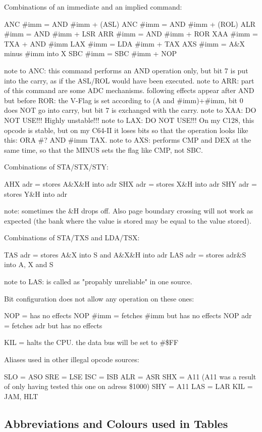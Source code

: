 \begin{code}
Combinations of an immediate and an implied command:

ANC \#{imm} = AND \#{imm} + (ASL)
ANC \#{imm} = AND \#{imm} + (ROL)
ALR \#{imm} = AND \#{imm} + LSR
ARR \#{imm} = AND \#{imm} + ROR
XAA \#{imm} = TXA + AND \#{imm}
LAX \#{imm} = LDA \#{imm} + TAX
AXS \#{imm} = A\&X minus #{imm} into X
SBC \#{imm} = SBC \#{imm} + NOP

note to ANC: this command performs an AND operation only, but bit 7 is put into the carry, as if the ASL/ROL would have been executed.
note to ARR: part of this command are some ADC mechanisms. following effects appear after AND but before ROR: the V-Flag is set according to (A and \#{imm})+\#{imm}, bit 0 does NOT go into carry, but bit 7 is exchanged with the carry.
note to XAA: DO NOT USE!!! Highly unstable!!!
note to LAX: DO NOT USE!!! On my C128, this opcode is stable, but on my C64-II it loses bits so that the operation looks like this: ORA \#? AND \#{imm} TAX.
note to AXS: performs CMP and DEX at the same time, so that the MINUS sets the flag like CMP, not SBC.


Combinations of STA/STX/STY:

AHX {adr} = stores A\&X\&H into {adr}
SHX {adr} = stores X\&H into {adr}
SHY {adr} = stores Y\&H into {adr}

note: sometimes the \&H drops off. Also page boundary crossing will not work as expected (the bank where the value is stored may be equal to the value stored).


Combinations of STA/TXS and LDA/TSX:

TAS {adr} = stores A\&X into S and A\&X\&H into {adr}
LAS {adr} = stores {adr}\&S into A, X and S

note to LAS: is called as "propably unreliable" in one source.


Bit configuration does not allow any operation on these ones:

NOP = has no effects
NOP #{imm} = fetches #{imm} but has no effects
NOP {adr} = fetches {adr} but has no effects


KIL = halts the CPU. the data bus will be set to \#\$FF


Aliases used in other illegal opcode sources:

SLO = ASO
SRE = LSE
ISC = ISB
ALR = ASR
SHX = A11 (A11 was a result of only having tested this one on adress \$1000)
SHY = A11
LAS = LAR
KIL = JAM, HLT

\end{code}
\fi

\subsection{Abbreviations and Colours used in Tables}
